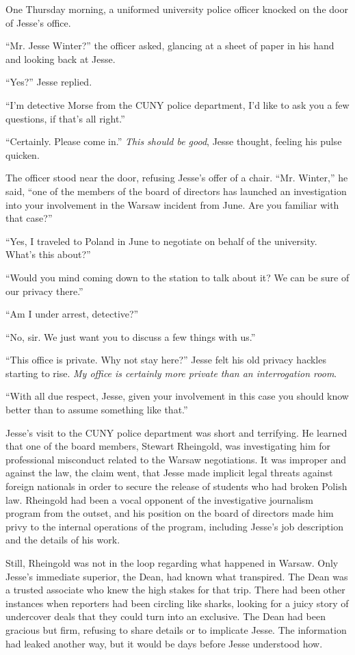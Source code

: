 \documentclass[12pt]{book}
\begin{document}
One Thursday morning, a uniformed university police officer knocked on the door of Jesse's office.

``Mr. Jesse Winter?'' the officer asked, glancing at a sheet of paper in his hand and looking back at Jesse.

``Yes?'' Jesse replied.

``I'm detective Morse from the CUNY police department, I'd like to ask you a few questions, if that's all right.''

``Certainly.  Please come in.''  \emph{This should be good}, Jesse thought, feeling his pulse quicken.

The officer stood near the door, refusing Jesse's offer of a chair.  ``Mr. Winter,'' he said, ``one of the members of the board of directors has launched an investigation into your involvement in the Warsaw incident from June.  Are you familiar with that case?''

``Yes, I traveled to Poland in June to negotiate on behalf of the university.  What's this about?''

``Would you mind coming down to the station to talk about it?  We can be sure of our privacy there.''

``Am I under arrest, detective?''

``No, sir.  We just want you to discuss a few things with us.''

``This office is private.  Why not stay here?''  Jesse felt his old privacy hackles starting to rise.  \emph{My office is certainly more private than an interrogation room}.

``With all due respect, Jesse, given your involvement in this case you should know better than to assume something like that.''


Jesse's visit to the CUNY police department was short and terrifying.  He learned that one of the board members, Stewart Rheingold, was investigating him for professional misconduct related to the Warsaw negotiations.  It was improper and against the law, the claim went, that Jesse made implicit legal threats against foreign nationals in order to secure the release of students who had broken Polish law.  Rheingold had been a vocal opponent of the investigative journalism program from the outset, and his position on the board of directors made him privy to the internal operations of the program, including Jesse's job description and the details of his work.

Still, Rheingold was not in the loop regarding what happened in Warsaw.  Only Jesse's immediate superior, the Dean, had known what transpired.  The Dean was a trusted associate who knew the high stakes for that trip.  There had been other instances when reporters had been circling like sharks, looking for a juicy story of undercover deals that they could turn into an exclusive.  The Dean had been gracious but firm, refusing to share details or to implicate Jesse.  The information had leaked another way, but it would be days before Jesse understood how.
\end{document}
